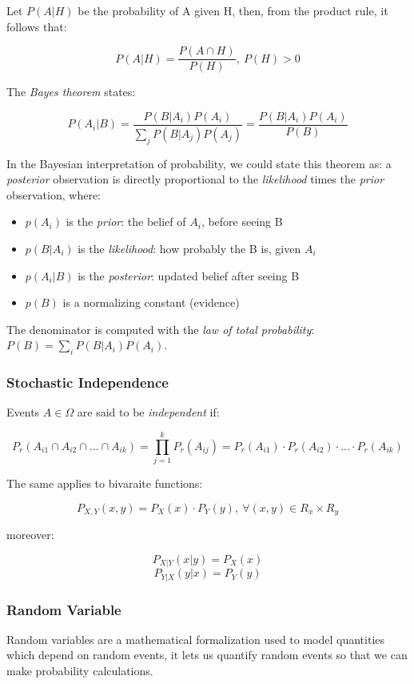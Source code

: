 \documentclass{article}
\begin{document}
Let \(P(A|H)\) be the probability of A given H, then, from the product
rule, it follows that:

\[P(A|H)=\frac{P(A\cap H)}{P(H)},\ P(H)>0\]

The \emph{Bayes theorem} states:

\[P(A_i|B)=\frac{P(B|A_i)P(A_i)}{\sum_j P(B|A_j)P(A_j)}=\frac{P(B|A_i)P(A_i)}{P(B)}\]

In the Bayesian interpretation of probability, we could state this
theorem as: a \emph{posterior} observation is directly proportional to
the \emph{likelihood} times the \emph{prior} observation, where:

\begin{itemize}
\item
  \(p(A_i)\) is the \emph{prior}: the belief of \(A_i\), before seeing B
\item
  \(p(B|A_i)\) is the \emph{likelihood}: how probably the B is, given
  \(A_i\)
\item
  \(p(A_i|B)\) is the \emph{posterior}: updated belief after seeing B
\item
  \(p(B)\) is a normalizing constant (evidence)
\end{itemize}

The denominator is computed with the \emph{law of total probability}:
\(P(B) = \sum_i
P(B|A_i) P(A_i)\).

\subsubsection{Stochastic Independence}\label{stochastic-independence}

Events \(A\in \Omega\) are said to be \emph{independent} if:

\[P_r(A_{i1} \cap A_{i2} \cap ... \cap A_{ik}) = \prod_{j=1}^k P_r(A_{ij}) = P_r(A_{i1})\cdot P_r(A_{i2})\cdot ...\cdot P_r(A_{ik})\]

The same applies to bivaraite functions:

\[P_{X, Y}(x, y) = P_X(x)\cdot P_Y(y),\ \forall (x, y)\in R_x \times R_y\]

moreover:

\[P_{X|Y}(x|y) = P_X(x)\] \[P_{Y|X}(y|x) = P_Y(y)\]

\subsubsection{Random Variable}\label{random-variable}

Random variables are a mathematical formalization used to model
quantities which depend on random events, it lets us quantify random
events so that we can make probability calculations.
\end{document}
